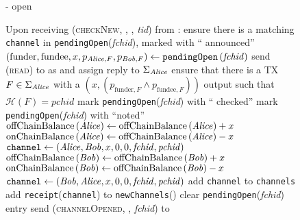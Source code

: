 \begin{figure}[H]
\begin{systembox}{\fpaynet - open}
\begin{algorithmic}[1]
        \State Upon receiving (\textsc{checkNew}, \alice, \bob, \textit{tid})
        from \alice:
        \Indent
          \State ensure there is a matching \texttt{channel} in
          \texttt{pendingOpen}(\textit{fchid}), marked with ``\alice{}
          announced''
          \label{alg:fpaynet:checkNew:valid}
          \State $\left(\mathrm{funder}, \mathrm{fundee}, x, p_{\mathit{Alice}, F},
          p_{\mathit{Bob}, F}\right) \gets
          \mathtt{pendingOpen}\left(\mathit{fchid}\right)$
          \State send (\textsc{read}) to \ledger{} as \alice{} and assign reply
          to $\Sigma_{\mathit{Alice}}$
          \label{alg:fpaynet:checkNew:read}
          \State ensure that there is a TX $F \in \Sigma_{\mathit{Alice}}$ with a
          $\left(x, \left(p_{\mathrm{funder}, F} \wedge p_{\mathrm{fundee},
          F}\right)\right)$ output such that $\mathcal{H}\left(F\right) =
          \mathit{pchid}$
          \label{alg:fpaynet:checkNew:included}
          \State mark \texttt{pendingOpen}(\textit{fchid}) with ``\alice{}
          checked''
          \label{alg:fpaynet:checkNew:mark}
            \State mark \texttt{pendingOpen}(\textit{fchid}) with ``noted''
              \State $\mathrm{offChainBalance}\left(\mathit{Alice}\right) \gets
              \mathrm{offChainBalance}\left(\mathit{Alice}\right) + x$ 
              \State $\mathrm{onChainBalance}\left(\mathit{Alice}\right) \gets
              \mathrm{offChainBalance}\left(\mathit{Alice}\right) - x$
              \State $\mathtt{channel} \gets \left(\mathit{Alice}, \mathit{Bob}, x, 0, 0,
              \mathit{fchid}, \mathit{pchid}\right)$
            \Else {}
              \State $\mathrm{offChainBalance}\left(\mathit{Bob}\right) \gets
              \mathrm{offChainBalance}\left(\mathit{Bob}\right) + x$ 
              \State $\mathrm{onChainBalance}\left(\mathit{Bob}\right) \gets
              \mathrm{offChainBalance}\left(\mathit{Bob}\right) - x$
              \State $\mathtt{channel} \gets \left(\mathit{Bob}, \mathit{Alice}, x, 0, 0,
              \mathit{fchid}, \mathit{pchid}\right)$
            \EndIf
            \State add \texttt{channel} to \texttt{channels}
          \EndIf
          \State add \texttt{receipt}(\texttt{channel}) to
          \texttt{newChannels}(\alice)
            \State clear \texttt{pendingOpen}(\textit{fchid}) entry
          \EndIf
          \State send (\textsc{channelOpened}, \alice, \textit{fchid}) to
          \simulator
          \label{alg:fpaynet:checkNew:sim}
        \EndIndent
      \end{algorithmic}
    \end{systembox}
    \caption{}
    \label{alg:fpaynet:open}
  \end{figure}

